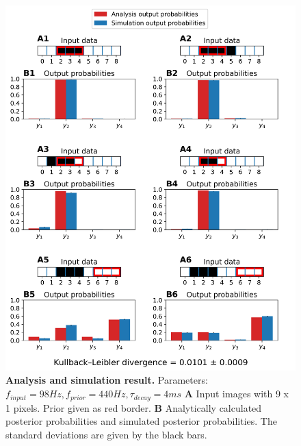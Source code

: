 \begin{figure}
  \includegraphics[width=\linewidth]{figures/1D/1D_98_440_4.png}
    \caption{\textbf{Analysis and simulation result. } Parameters: $f_{input} = 98 Hz, f_{prior} = 440 Hz, \tau_{decay} = 4 ms$ \textbf{A} Input images with 9 x 1 pixels. Prior given as red border. \textbf{B} Analytically calculated posterior probabilities and simulated posterior probabilities. The standard deviations are given by the black bars.}
  \label{fig:1D_98_440_4}
\end{figure}

